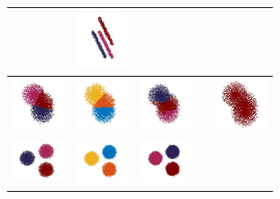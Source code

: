 \documentclass[12pt]{drexelthesis}
\begin{document}
\begin{table}[h!]
\begin{center}
\begin{tabular}{ | c | p{3cm} | p{3cm} | p{3cm} | p{3cm} | }
      &
             \includegraphics[trim={0 1cm 0 1cm},clip, width=1.5cm]{2d-cluster-tests/euclidean-distance/lines.jpg}    
      \\ \hline
      
           \includegraphics[trim={0 1cm 0 1cm},clip,width=1.5cm]{2d-cluster-tests/k-means/blob.jpg}
      & 
           \includegraphics[trim={0 0cm 0 0cm},clip,width=1.5cm]{2d-cluster-tests/fcm/blob.jpg} 
      & 
           \includegraphics[trim={0 1cm 0 1cm},clip,width=1.5cm]{2d-cluster-tests/agglomerative/blob.jpg} 
      &

      &
           \includegraphics[trim={0 1cm 0 1cm},clip,width=1.5cm]{2d-cluster-tests/euclidean-distance/blob.jpg} 
      \\ \hline
      
            \includegraphics[trim={0 1cm 0 1cm},clip,width=1.5cm]{2d-cluster-tests/k-means/solid_circles.jpg}
      & 
            \includegraphics[trim={0 1cm 0 1cm},clip,width=1.5cm]{2d-cluster-tests/fcm/circles.jpg}
      & 
            \includegraphics[trim={0 1cm 0 1cm},clip,width=1.5cm]{2d-cluster-tests/agglomerative/solid_circles.jpg}
      &


\end{tabular}
\end{center}
\end{table}
\end{document}
